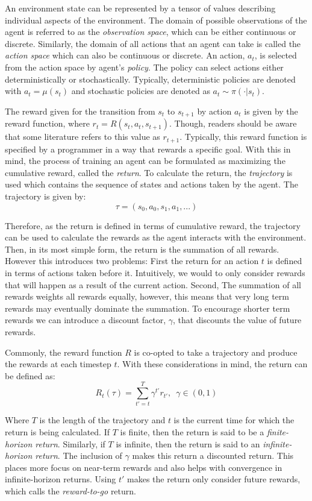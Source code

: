 \documentclass[conference]{IEEEtran}
\begin{document}
An environment state can be represented by a tensor of values describing individual aspects of the environment. The domain of possible observations of the agent is referred to as the \textit{observation space}, which can be either continuous or discrete. Similarly, the domain of all actions that an agent can take is called the \textit{action space} which can also be continuous or discrete. An action, $a_t$, is selected from the action space by agent's \textit{policy}. The policy can select actions either deterministically or stochastically. Typically, deterministic policies are denoted with $a_t = \mu(s_t)$ and stochastic policies are denoted as $a_t \sim \pi(\cdot | s_t)$. \cite{spinning_up_intro}



The reward given for the transition from $s_t$ to $s_{t+1}$ by action $a_t$ is given by the reward function, where $r_t = R(s_t, a_t, s_{t+1})$. Though, readers should be aware that some literature refers to this value as $r_{t+1}$. Typically, this reward function is specified by a programmer in a way that rewards a specific goal. With this in mind, the process of training an agent can be formulated as maximizing the cumulative reward, called the \textit{return}. To calculate the return, the \textit{trajectory} is used which contains the sequence of states and actions taken by the agent. The trajectory is given by:
$$
    \tau = (s_0, a_0, s_1, a_1, ...)
$$

Therefore, as the return is defined in terms of cumulative reward, the trajectory can be used to calculate the rewards as the agent interacts with the environment. Then, in its most simple form, the return is the summation of all rewards. However this introduces two problems: First the return for an action $t$ is defined in terms of actions taken before it. Intuitively, we would to only consider rewards that will happen as a result of the current action. Second, The summation of all rewards weights all rewards equally, however, this means that very long term rewards may eventually dominate the summation. To encourage shorter term rewards we can introduce a discount factor, $\gamma$, that discounts the value of future rewards.

Commonly, the reward function $R$ is co-opted to take a trajectory and produce the rewards at each timestep $t$. With these considerations in mind, the return can be defined as:
$$
    R_t(\tau) = \sum_{t'=t}^T \gamma^{t'} r_{t'}, \enspace \gamma \in (0, 1)
$$

Where $T$ is the length of the trajectory and $t$ is the current time for which the return is being calculated. If $T$ is finite, then the return is said to be a \textit{finite-horizon return}. Similarly, if $T$ is infinite, then the return is said to an \textit{infinite-horizon return}. The inclusion of $\gamma$ makes this return a discounted return. This places more focus on near-term rewards and also helps with convergence in infinite-horizon returns. Using $t'$ makes the return only consider future rewards, which \cite{spinning_up_policy_optimization} calls the \textit{reward-to-go} return.
\end{document}
